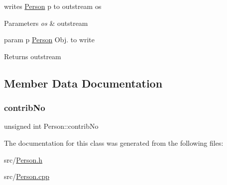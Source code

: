 writes \hyperlink{classPerson}{Person} p to outstream os 


\begin{DoxyParams}{Parameters}
{\em os} & outstream\\
\hline
\end{DoxyParams}
param p \hyperlink{classPerson}{Person} Obj. to write

\begin{DoxyReturn}{Returns}
outstream 
\end{DoxyReturn}


\subsection{Member Data Documentation}
\mbox{\label{classPerson_a55eea8ffb71b88d84ea43a6be15a2eb4}} 
\subsubsection{\texorpdfstring{contrib\+No}{contribNo}}
{\footnotesize\ttfamily unsigned int Person\+::contrib\+No\hspace{0.3cm}{\ttfamily [private]}}



The documentation for this class was generated from the following files\+:\begin{DoxyCompactItemize}
\item 
src/\hyperlink{Person_8h}{Person.\+h}\item 
src/\hyperlink{Person_8cpp}{Person.\+cpp}\end{DoxyCompactItemize}
